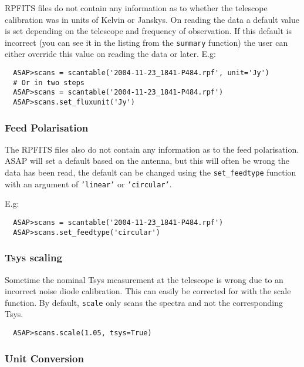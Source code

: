 \documentclass[11pt]{article}
\newcommand{\cmd}[1]{{\tt #1}}
\begin{document}
RPFITS files do not contain any information as
to whether the telescope calibration was in units of Kelvin or
Janskys.  On reading the data a default value is set depending on the
telescope and frequency of observation.  If this default is incorrect
(you can see it in the listing from the \cmd{summary} function) the
user can either override this value on reading the data or later.
E.g:

\begin{verbatim}
  ASAP>scans = scantable('2004-11-23_1841-P484.rpf', unit='Jy')
  # Or in two steps
  ASAP>scans = scantable('2004-11-23_1841-P484.rpf')
  ASAP>scans.set_fluxunit('Jy')
\end{verbatim}

\subsubsection{Feed Polarisation}

The RPFITS files also do not contain any
information as to the feed polarisation. ASAP will set a default based
on the antenna, but this will often be wrong the data has been read,
the default can be changed using the \cmd{set\_feedtype} function with
an argument of \cmd{'linear'} or \cmd{'circular'}.

E.g:

\begin{verbatim}
  ASAP>scans = scantable('2004-11-23_1841-P484.rpf')
  ASAP>scans.set_feedtype('circular')
\end{verbatim}

\subsubsection{Tsys scaling}

Sometime the nominal Tsys measurement at the
telescope is wrong due to an incorrect noise diode calibration. This
can easily be corrected for with the scale function. By default,
\cmd{scale} only scans the spectra and not the corresponding Tsys.

\begin{verbatim}
  ASAP>scans.scale(1.05, tsys=True)
\end{verbatim}

\subsubsection{Unit Conversion}
\end{document}
